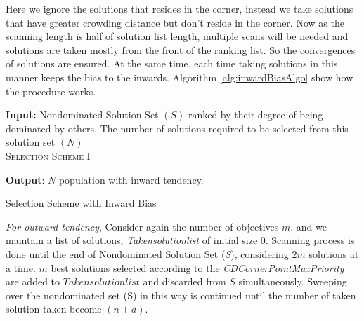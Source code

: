 \documentclass[journal]{IEEEtran}
\begin{document}
Here we ignore the solutions that resides in the corner, instead we take solutions that have greater crowding distance but don't reside in the corner. Now as the scanning length is half of solution list length, multiple scans will be needed and solutions are taken mostly from the front of the ranking list. So the convergences of solutions are ensured. At the same time, each time taking solutions in this manner keeps the bias to the inwards. Algorithm \ref{alg:inwardBiasAlgo} show how the procedure works.



\begin{algorithm}[!h]
\textbf{Input:} Nondominated Solution Set $(S)$ ranked by their degree of being dominated by others, The number of solutions required to be selected from this solution set $(N)$\\
\textsc{Selection Scheme I}
\begin{algorithmic}[1]
 
	\ENDFOR
{}	
\ENDWHILE
{}
\end{algorithmic}
\textbf{Output}: $N$ population with inward tendency.
\caption{Selection Scheme with Inward Bias}
\label{alg:inwardBiasAlgo}
\end{algorithm}


\textit{For outward tendency},
Consider again the number of objectives $m$, and we maintain a list of solutions, \textit{Takensolutionlist} of  initial size $0$. Scanning process is done until the end of Nondominated Solution Set (\textit{S}), considering $2m$ solutions at a time. $m$ best solutions selected according to the \textit{CDCornerPointMaxPriority} are added to $Takensolutionlist$ and discarded from $S$ simultaneously. Sweeping over the nondominated set (S) in this way is continued until the number of taken solution taken become $(n+d)$.
\end{document}
